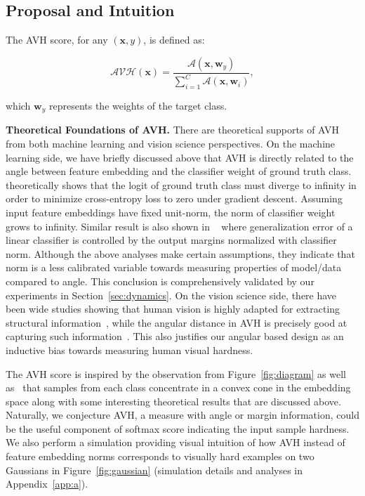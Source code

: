 \subsection{Proposal and Intuition}\label{sec:avh}

\begin{defn} The AVH score, for any ${(\bm{x}, y)}$, is defined as:

\begin{small}
\begin{equation}
    \mathcal{AVH}(\bm{x}) = \frac{\mathcal{A}(\bm{x},\bm{w}_{y})}{\sum_{i=1}^{C} \mathcal{A}(\bm{x}, \bm{w}_i)},
\end{equation}
\end{small}

which $\bm{w}_y$ represents the weights of the target class.
\end{defn}

\label{def:4}

\textbf{Theoretical Foundations of AVH.} There are theoretical supports of AVH from both machine learning and vision science perspectives. On the machine learning side, we have briefly discussed above that AVH is directly related to the angle between feature embedding and the classifier weight of ground truth class. \cite{soudry2018implicit} theoretically shows that the logit of ground truth class must diverge to infinity in order to minimize cross-entropy loss to zero under gradient descent. Assuming input feature embeddings have fixed unit-norm, the norm of classifier weight grows to infinity. Similar result is also shown in ~\cite{wei2019improved} where generalization error of a linear classifier is controlled by the output margins normalized with classifier norm. Although the above analyses make certain assumptions, they indicate that norm is a less calibrated variable towards measuring properties of model/data compared to angle. This conclusion is comprehensively validated by our experiments in Section~\ref{sec:dynamics}. On the vision science side, there have been wide studies showing that human vision is highly adapted for extracting structural information~\cite{zhang2018unreasonable,wang2004image}, while the angular distance in AVH is precisely good at capturing such information~\cite{liu2018decoupled}. This also justifies our angular based design as an inductive bias towards measuring human visual hardness.

The AVH score is inspired by the observation from Figure~\ref{fig:diagram} as well as~\citep{liu2018decoupled} that samples from each class concentrate in a convex cone in the embedding space along with some interesting theoretical results that are discussed above. Naturally, we conjecture AVH, a measure with angle or margin information, could be the useful component of softmax score indicating the input sample hardness. We also perform a simulation providing visual intuition of how AVH instead of feature embedding norms corresponds to visually hard examples on two Gaussians in Figure~\ref{fig:gaussian} (simulation details and analyses in Appendix~\ref{app:a}). 

